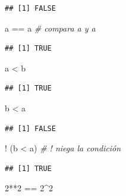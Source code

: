 \documentclass[
]{book}
\newenvironment{Shaded}{\begin{snugshade}}{\end{snugshade}}
\newcommand{\CommentTok}[1]{\textcolor[rgb]{0.56,0.35,0.01}{\textit{#1}}}
\newcommand{\DecValTok}[1]{\textcolor[rgb]{0.00,0.00,0.81}{#1}}
\newcommand{\NormalTok}[1]{#1}
\newcommand{\SpecialCharTok}[1]{\textcolor[rgb]{0.00,0.00,0.00}{#1}}
\theoremstyle{break}
\begin{document}
\begin{verbatim}
## [1] FALSE
\end{verbatim}

\begin{Shaded}
\begin{Highlighting}[]
\NormalTok{a }\SpecialCharTok{==}\NormalTok{ a  }\CommentTok{\# compara a y a}
\end{Highlighting}
\end{Shaded}

\begin{verbatim}
## [1] TRUE
\end{verbatim}

\begin{Shaded}
\begin{Highlighting}[]
\NormalTok{a }\SpecialCharTok{\textless{}}\NormalTok{ b}
\end{Highlighting}
\end{Shaded}

\begin{verbatim}
## [1] TRUE
\end{verbatim}

\begin{Shaded}
\begin{Highlighting}[]
\NormalTok{b }\SpecialCharTok{\textless{}}\NormalTok{ a}
\end{Highlighting}
\end{Shaded}

\begin{verbatim}
## [1] FALSE
\end{verbatim}

\begin{Shaded}
\begin{Highlighting}[]
\SpecialCharTok{!}\NormalTok{ (b }\SpecialCharTok{\textless{}}\NormalTok{ a) }\CommentTok{\# ! niega la condición}
\end{Highlighting}
\end{Shaded}

\begin{verbatim}
## [1] TRUE
\end{verbatim}

\begin{Shaded}
\begin{Highlighting}[]
\DecValTok{2}\SpecialCharTok{**}\DecValTok{2} \SpecialCharTok{==} \DecValTok{2}\SpecialCharTok{\^{}}\DecValTok{2}
\end{Highlighting}
\end{Shaded}
\end{document}
